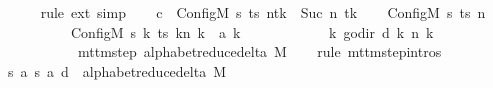 \begin{isabellebody}
\ \ \ \ \isamarkupfalse%
\ {\isacharparenleft}{\kern0pt}rule\ ext{\isacharparenright}{\kern0pt}\ simp\isanewline
\ \ \isamarkupfalse%
\ {\isacharquery}{\kern0pt}c{\isacharprime}{\kern0pt}{\isacharprime}{\kern0pt}\ {\isacharequal}{\kern0pt}\ {\isachardoublequoteopen}Config\isactrlsub M\ {\isacharquery}{\kern0pt}s{\isacharprime}{\kern0pt}\ ts\ {\isacharparenleft}{\kern0pt}n{\isacharparenleft}{\kern0pt}tk\ {\isacharcolon}{\kern0pt}{\isacharequal}{\kern0pt}\ Suc\ {\isacharparenleft}{\kern0pt}n\ tk{\isacharparenright}{\kern0pt}{\isacharparenright}{\kern0pt}{\isacharparenright}{\kern0pt}{\isachardoublequoteclose}\isanewline
\ \ \isamarkupfalse%
\ {\isachardoublequoteopen}{\isacharparenleft}{\kern0pt}Config\isactrlsub M\ {\isacharquery}{\kern0pt}s\ ts\ n{\isacharcomma}{\kern0pt}\isanewline
\ \ \ \ \ \ \ \ \ \ Config\isactrlsub M\ {\isacharquery}{\kern0pt}s{\isacharprime}{\kern0pt}\ {\isacharparenleft}{\kern0pt}{\isasymlambda}k{\isachardot}{\kern0pt}\ {\isacharparenleft}{\kern0pt}ts\ k{\isacharparenright}{\kern0pt}{\isacharparenleft}{\kern0pt}n\ k\ {\isacharcolon}{\kern0pt}{\isacharequal}{\kern0pt}\ {\isacharquery}{\kern0pt}a\ k{\isacharparenright}{\kern0pt}{\isacharparenright}{\kern0pt}\isanewline
\ \ \ \ \ \ \ \ \ \ \ \ {\isacharparenleft}{\kern0pt}{\isasymlambda}k{\isachardot}{\kern0pt}\ go{\isacharunderscore}{\kern0pt}dir\ {\isacharparenleft}{\kern0pt}{\isacharquery}{\kern0pt}d\ k{\isacharparenright}{\kern0pt}\ {\isacharparenleft}{\kern0pt}n\ k{\isacharparenright}{\kern0pt}{\isacharparenright}{\kern0pt}{\isacharparenright}{\kern0pt}\isanewline
\ \ \ \ \ \ \ \ \ \ {\isasymin}\ mttm{\isacharunderscore}{\kern0pt}step\ {\isacharparenleft}{\kern0pt}alphabet{\isacharunderscore}{\kern0pt}reduce{\isacharunderscore}{\kern0pt}delta\ M{\isacharparenright}{\kern0pt}{\isachardoublequoteclose}\isanewline
\ \ \isamarkupfalse%
\ {\isacharparenleft}{\kern0pt}rule\ mttm{\isacharunderscore}{\kern0pt}step{\isachardot}{\kern0pt}intros{\isacharparenright}{\kern0pt}\isanewline
\ \ \ \ \isamarkupfalse%
\ {\isachardoublequoteopen}{\isacharparenleft}{\kern0pt}{\isacharquery}{\kern0pt}s{\isacharcomma}{\kern0pt}\ {\isacharquery}{\kern0pt}a{\isacharcomma}{\kern0pt}\ {\isacharquery}{\kern0pt}s{\isacharprime}{\kern0pt}{\isacharcomma}{\kern0pt}\ {\isacharquery}{\kern0pt}a{\isacharcomma}{\kern0pt}\ {\isacharquery}{\kern0pt}d{\isacharparenright}{\kern0pt}\ {\isasymin}\ alphabet{\isacharunderscore}{\kern0pt}reduce{\isacharunderscore}{\kern0pt}delta\ M{\isachardoublequoteclose}\ \isamarkupfalse%

\end{isabellebody}
